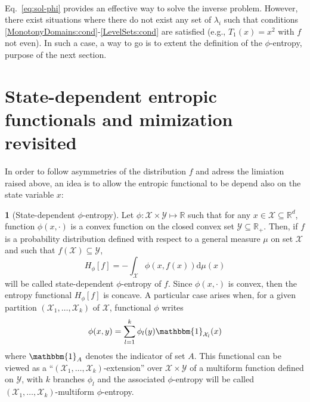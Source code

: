 \documentclass[english,sort&compress]{elsarticle}
\theoremstyle{definition}
\newtheorem{defn}{\protect\definitionname}
\theoremstyle{plain}
\theoremstyle{plain}
\providecommand{\definitionname}{Definition}
\def\dmu{\mathrm{d}\mu}
\def\Rset{\mathbb{R}}
\def\X{\mathcal{X}}
\def\Y{\mathcal{Y}}
\def\un{\mathbbm{1}}
\begin{document}
\

Eq.~\eqref{eq:sol-phi}  provides   an  effective   way  to  solve   the  inverse
problem. However,  there exist situations  where there do  not exist any  set of
$\lambda_i$                 such                 that                 conditions
\ref{MonotonyDomains:cond}-\ref{LevelSets:cond}   are   satisfied   (e.g.,
$T_1(x) = x^2$ with $f$ not even).  In such a case, a way to go is to extent the
definition of the $\phi$-entropy, purpose of the next section.





\section{State-dependent entropic functionals and mimization revisited}
\label{sec:MultiformEnt}

In order to follow asymmetries of  the distribution $f$ and adress the limiation
raised above, an idea  is to allow the entropic functional to  be depend also on
the state variable $x$:
%
\begin{defn}[State-dependent $\phi$-entropy]\label{def:asym_phi-entropy}
  Let $\phi: \X \times  \Y \mapsto \Rset$ such that for any  $x \in \X \subseteq
  \Rset^d$, function $\phi(x,\cdot)$  is a convex function on  the closed convex
  set  $\Y \subseteq  \Rset_+$.   Then,  if $f$  is  a probability  distribution
  defined with  respect to  a general measure  $\mu$ on  set $\X$ and  such that
  $f(\X) \subseteq \Y$,
  \begin{equation}\label{eq:asym_phi-entropy}
    H_\phi[f] = - \int_\X \phi(x,f(x)) \dmu(x)
  \end{equation}
  will be  called state-dependent $\phi$-entropy of  $f$.  Since $\phi(x,\cdot)$
  is convex, then the entropy functional $H_\phi[f]$ is concave.
  A particular case arises when, for  a given partition $(\X_1 , \ldots , \X_k)$
  of $\X$, functional $\phi$ writes
  \begin{equation}\label{eq:multiform_phi-entropy}
    \phi(x,y) = \sum_{l=1}^k \phi_l(y) \un_{\X_l}(x)
  \end{equation}
  where $\un_A$ denotes the indicator of set $A$.  This functional can be viewed
  as a ``$(\X_1 , \ldots , \X_k)$-extension'' over $\X \times \Y$ of a multiform
  function  defined on  $\Y$,  with  $k$ branches  $\phi_l$  and the  associated
  $\phi$-entropy   will   be  called   $(\X_1   ,   \ldots  ,   \X_k)$-multiform
  $\phi$-entropy.
\end{defn}
\end{document}
